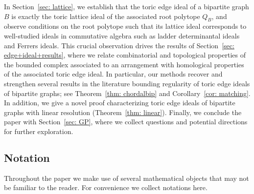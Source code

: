 In Section~\ref{sec: lattice}, we establish that the toric edge ideal of a bipartite graph $B$ is exactly the toric lattice ideal of the associated root polytope $Q_B$, and observe conditions on the root polytope such that its lattice ideal corresponds to well-studied ideals in commutative algebra such as ladder determinantal ideals and Ferrers ideals. This crucial observation drives the results of Section~\ref{sec: edge+ideal+results}, where we relate combinatorial and topological properties of the bounded complex associated to an arrangement with homological properties of the associated toric edge ideal. In particular, our methods recover and strengthen several results in the literature bounding regularity of toric edge ideals of bipartite graphs; see Theorem~\ref{thm: chordalbip} and Corollary~\ref{cor: matching}. In addition, we give a novel proof characterizing toric edge ideals of bipartite graphs with linear resolution (Theorem~\ref{thm: linear}). Finally, we conclude the paper with Section~\ref{sec: GP}, where we collect questions and potential directions for further exploration.

\subsection{Notation} Throughout the paper we make use of several mathematical objects that may not be familiar to the reader. For convenience we collect notations here.


